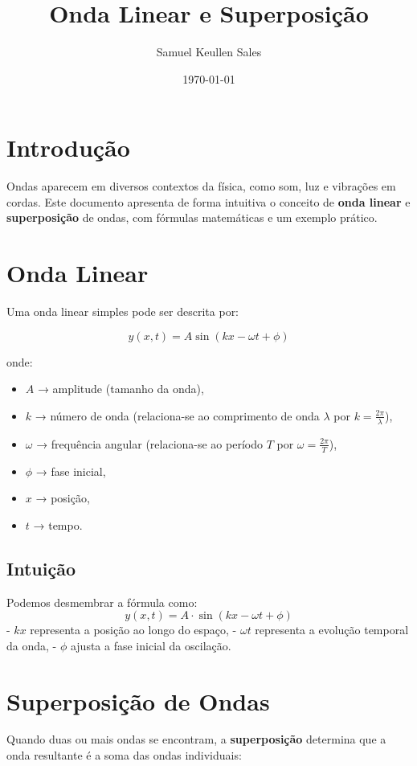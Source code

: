 \documentclass[12pt,a4paper]{article}
\title{Onda Linear e Superposição}
\author{Samuel Keullen Sales}
\date{\today}
\begin{document}
\maketitle

\section{Introdução}
Ondas aparecem em diversos contextos da física, como som, luz e vibrações em cordas. 
Este documento apresenta de forma intuitiva o conceito de \textbf{onda linear} e \textbf{superposição} de ondas, com fórmulas matemáticas e um exemplo prático.

\section{Onda Linear}
Uma onda linear simples pode ser descrita por:

\begin{equation}
y(x,t) = A \sin(kx - \omega t + \phi)
\end{equation}

\noindent onde:
\begin{itemize}
    \item $A$ → amplitude (tamanho da onda),
    \item $k$ → número de onda (relaciona-se ao comprimento de onda $\lambda$ por $k = \frac{2\pi}{\lambda}$),
    \item $\omega$ → frequência angular (relaciona-se ao período $T$ por $\omega = \frac{2\pi}{T}$),
    \item $\phi$ → fase inicial,
    \item $x$ → posição,
    \item $t$ → tempo.
\end{itemize}

\subsection*{Intuição}
Podemos desmembrar a fórmula como:
\[
y(x,t) = A \cdot \sin(kx - \omega t + \phi)
\]
- $kx$ representa a posição ao longo do espaço,  
- $\omega t$ representa a evolução temporal da onda,  
- $\phi$ ajusta a fase inicial da oscilação.  

\section{Superposição de Ondas}
Quando duas ou mais ondas se encontram, a \textbf{superposição} determina que a onda resultante é a soma das ondas individuais:
\end{document}
